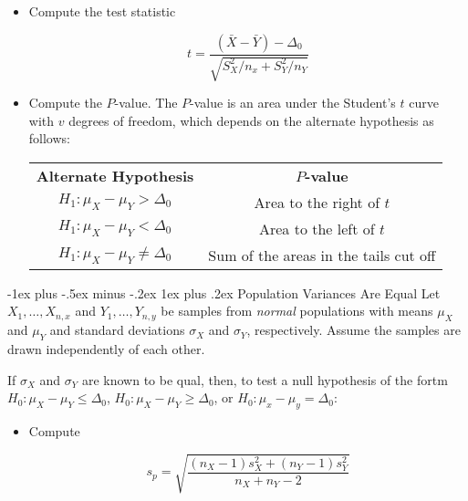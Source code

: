 \documentclass[9pt,landscape]{memoir}
\makeatletter
\renewcommand{\subsubsection}{\@startsection{subsubsection}{3}{0mm}%
    {-1ex plus -.5ex minus -.2ex}%
    {1ex plus .2ex}%
{\normalfont\small\bfseries}}
\makeatother
\begin{document}
\begin{multicols}{3}
\begin{itemize}
        \item Compute the test statistic

            \begin{equation*}
                t = \frac{(\bar{X} - \bar{Y}) - \Delta_0}
                {\sqrt{S_X ^2 / n_x + S_Y ^2 / n_Y}}
            \end{equation*}

        \item Compute the $P$-value. The $P$-value is an area under the Student's $t$ curve with $v$ degrees of freedom, which depends on the alternate hypothesis as follows:

            \vspace{2mm}
            \begin{tabular}{cc}
                \textbf{Alternate Hypothesis} & \textbf{$P$-value} \\
                $H_1: \mu_X - \mu_Y > \Delta_0$ & Area to the right of $t$ \\
                $H_1: \mu_X - \mu_Y < \Delta_0$ & Area to the left of $t$ \\
                $H_1: \mu_X - \mu_Y \neq \Delta_0$ & Sum of the areas in the tails cut off \\
            \end{tabular}
    \end{itemize}


    \subsubsection{Population Variances Are Equal}
    Let $X_1, \ldots, X_{n, x}$ and $Y_1, \ldots, Y_{n, y}$ be samples from \textit{normal} populations with means $\mu_X$ and $\mu_Y$ and standard deviations $\sigma_X$ and $\sigma_Y$, respectively. Assume the samples are drawn independently of each other.

    If $\sigma_X$ and $\sigma_Y$ are known to be qual, then, to test a null hypothesis of the fortm $H_0: \mu_X - \mu_Y \leq \Delta_0$, $H_0: \mu_X - \mu_Y \geq \Delta_0$, or $H_0: \mu_x - \mu_y = \Delta_0$:

    \begin{itemize}
        \item Compute

            \begin{equation*}
                s_p = \sqrt{\frac{
                        (n_X - 1)s_X^2 + (n_Y - 1)s_Y^2
                    }{
                        n_X + n_Y - 2
                }}
            \end{equation*}


\end{itemize}
\end{multicols}
\end{document}
